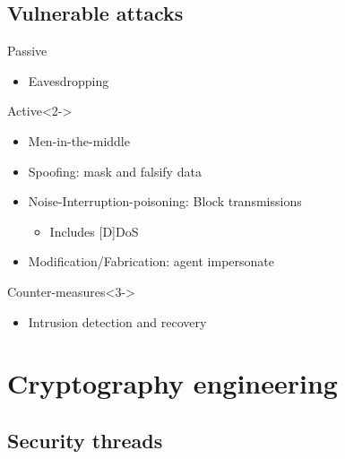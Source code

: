 \documentclass{beamer}
\begin{document}

\subsection{Vulnerable attacks}

\begin{frame}
    \begin{block}{Passive}
        \begin{itemize}
            \item Eavesdropping
        \end{itemize}
    \end{block}
    \begin{block}{Active}<2->
        \begin{itemize}
            \item Men-in-the-middle
            \item Spoofing: mask and falsify data
            \item Noise-Interruption-poisoning: Block transmissions
            \begin{itemize}
                \item Includes [D]DoS
            \end{itemize}
            \item Modification/Fabrication: agent impersonate
        \end{itemize}
    \end{block}
    \begin{block}{Counter-measures}<3->
        \begin{itemize}
            \item Intrusion detection and recovery
        \end{itemize}
    \end{block}
\end{frame}

\section{Cryptography engineering}

\subsection{Security threads}
\end{document}
